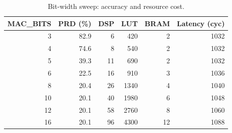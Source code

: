 \begin{table}[t]
\centering
\caption{Bit-width sweep: accuracy and resource cost.}
\begin{tabular}{r r r r r r}
\toprule
MAC\_BITS & PRD (\%) & DSP & LUT & BRAM & Latency (cyc) \\
\midrule
3 & 82.9 & 6 & 420 & 2 & 1032 \\
4 & 74.6 & 8 & 540 & 2 & 1032 \\
5 & 39.3 & 11 & 690 & 2 & 1032 \\
6 & 22.5 & 16 & 910 & 3 & 1036 \\
8 & 20.4 & 26 & 1340 & 4 & 1040 \\
10 & 20.1 & 40 & 1980 & 6 & 1048 \\
12 & 20.1 & 58 & 2760 & 8 & 1060 \\
16 & 20.1 & 96 & 4300 & 12 & 1088 \\
\bottomrule
\end{tabular}
\end{table}
